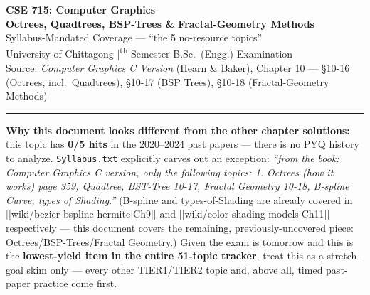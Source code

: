 \documentclass[12pt, a4paper]{article}
\newenvironment{notesbox}{\begin{mdframed}[style=notesframe]}{\end{mdframed}}
\begin{document}
\begin{center}
  {\LARGE\bfseries\color{sectionblue} CSE 715: Computer Graphics}\\[0.6em]
  {\Large\bfseries Octrees, Quadtrees, BSP-Trees \& Fractal-Geometry Methods}\\[0.3em]
  {\large Syllabus-Mandated Coverage --- ``the 5 no-resource topics''}\\[0.2em]
  {\normalsize University of Chittagong \quad|\textsuperscript{th} Semester B.Sc.\ (Engg.) Examination}\\[0.3em]
  {\small Source: \emph{Computer Graphics C Version} (Hearn \& Baker), Chapter 10 --- \S10-16 (Octrees, incl.\ Quadtrees), \S10-17 (BSP Trees), \S10-18 (Fractal-Geometry Methods)}
\end{center}

\vspace{0.3em}\noindent\rule{\linewidth}{1pt}\vspace{0.5em}

\begin{notesbox}
\textbf{Why this document looks different from the other chapter solutions:} this topic has \textbf{0/5 hits} in the 2020--2024 past papers --- there is no PYQ history to analyze. \texttt{Syllabus.txt} explicitly carves out an exception: \emph{``from the book: Computer Graphics C version, only the following topics: 1. Octrees (how it works) page 359, Quadtree, BST-Tree 10-17, Fractal Geometry 10-18, B-spline Curve, types of Shading.''} (B-spline and types-of-Shading are already covered in [[wiki/bezier-bspline-hermite|Ch9]] and [[wiki/color-shading-models|Ch11]] respectively --- this document covers the remaining, previously-uncovered piece: Octrees/BSP-Trees/Fractal Geometry.) Given the exam is tomorrow and this is the \textbf{lowest-yield item in the entire 51-topic tracker}, treat this as a stretch-goal skim only --- every other TIER1/TIER2 topic and, above all, timed past-paper practice come first.
\end{notesbox}

\tableofcontents
\newpage

\end{document}
